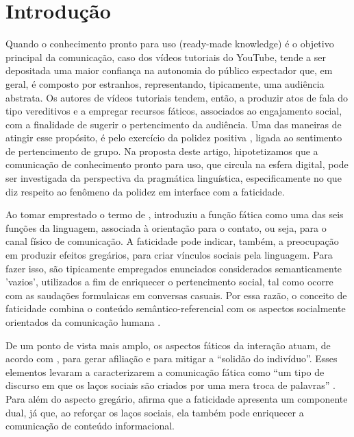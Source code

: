 \documentclass[portuguese]{textolivre}
\begin{document}
\section{Introdução}\label{sec-intro}

Quando o conhecimento pronto para uso (ready-made knowledge) é o objetivo principal da comunicação, caso dos vídeos tutoriais do YouTube, tende a ser depositada uma maior confiança na autonomia do público espectador que, em geral, é composto por estranhos, representando, tipicamente, uma audiência abstrata. Os autores de vídeos tutoriais tendem, então, a produzir atos de fala do tipo vereditivos e a empregar recursos fáticos, associados ao engajamento social, com a finalidade de sugerir o pertencimento da audiência. Uma das maneiras de atingir esse propósito, é pelo exercício da polidez positiva \cite{brown1987, leech2014,miller2008}, ligada ao sentimento de pertencimento de grupo. Na proposta deste artigo, hipotetizamos que a comunicação de conhecimento pronto para uso, que circula na esfera digital, pode ser investigada da perspectiva da pragmática linguística, especificamente no que diz respeito ao fenômeno da polidez em interface com a faticidade.   

Ao tomar emprestado o termo de \textcite{malinowski1923}, \textcite{jakobson1960} introduziu a função fática como uma das seis funções da linguagem, associada à orientação para o contato, ou seja, para o canal físico de comunicação. A faticidade pode indicar, também, a preocupação em produzir efeitos gregários, para criar vínculos sociais pela linguagem. Para fazer isso, são tipicamente empregados enunciados considerados semanticamente 'vazios', utilizados a fim de enriquecer o pertencimento social, tal como ocorre com as saudações formulaicas em conversas casuais. Por essa razão, o conceito de faticidade combina o conteúdo semântico-referencial com os aspectos socialmente orientados da comunicação humana \cite{meltzer2003, hazaparu2015, zuckerman2016}.

De um ponto de vista mais amplo, os aspectos fáticos da interação atuam, de acordo com \textcite[p. 255]{simmel1949}, para gerar afiliação e para mitigar a “solidão do indivíduo”. Esses elementos levaram \textcite{ogden1946} a caracterizarem a comunicação fática como “um tipo de discurso em que os laços sociais são criados por uma mera troca de palavras” \cite[p. 315]{ogden1946}. Para além do aspecto gregário, \cite{nunez1983} afirma que a faticidade apresenta um componente dual, já que, ao reforçar os laços sociais, ela também pode enriquecer a comunicação de conteúdo informacional.
\end{document}
